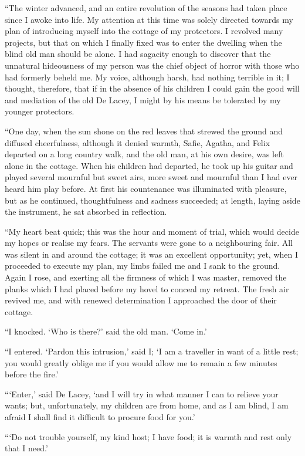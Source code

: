 \documentclass[12pt,openright]{book}
\begin{document}
“The winter advanced, and an entire revolution of the seasons had taken place since I awoke into life. My attention at this time was solely directed towards my plan of introducing myself into the cottage of my protectors. I revolved many projects, but that on which I finally fixed was to enter the dwelling when the blind old man should be alone. I had sagacity enough to discover that the unnatural hideousness of my person was the chief object of horror with those who had formerly beheld me. My voice, although harsh, had nothing terrible in it; I thought, therefore, that if in the absence of his children I could gain the good will and mediation of the old De Lacey, I might by his means be tolerated by my younger protectors.

“One day, when the sun shone on the red leaves that strewed the ground and diffused cheerfulness, although it denied warmth, Safie, Agatha, and Felix departed on a long country walk, and the old man, at his own desire, was left alone in the cottage. When his children had departed, he took up his guitar and played several mournful but sweet airs, more sweet and mournful than I had ever heard him play before. At first his countenance was illuminated with pleasure, but as he continued, thoughtfulness and sadness succeeded; at length, laying aside the instrument, he sat absorbed in reflection.

“My heart beat quick; this was the hour and moment of trial, which would decide my hopes or realise my fears. The servants were gone to a neighbouring fair. All was silent in and around the cottage; it was an excellent opportunity; yet, when I proceeded to execute my plan, my limbs failed me and I sank to the ground. Again I rose, and exerting all the firmness of which I was master, removed the planks which I had placed before my hovel to conceal my retreat. The fresh air revived me, and with renewed determination I approached the door of their cottage.

“I knocked. ‘Who is there?’ said the old man. ‘Come in.’

“I entered. ‘Pardon this intrusion,’ said I; ‘I am a traveller in want of a little rest; you would greatly oblige me if you would allow me to remain a few minutes before the fire.’

“‘Enter,’ said De Lacey, ‘and I will try in what manner I can to relieve your wants; but, unfortunately, my children are from home, and as I am blind, I am afraid I shall find it difficult to procure food for you.’

“‘Do not trouble yourself, my kind host; I have food; it is warmth and rest only that I need.’
\end{document}
